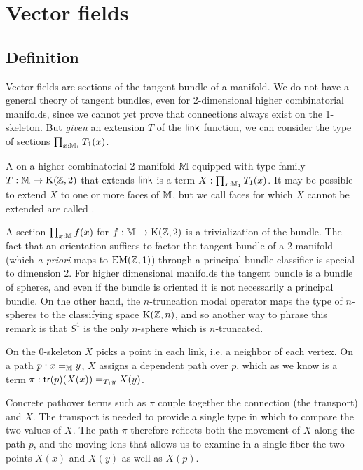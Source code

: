 \section{Vector fields}
\subsection{Definition}
Vector fields are sections of the tangent bundle of a manifold. We do not have a general theory of tangent bundles, even for 2-dimensional higher combinatorial manifolds, since we cannot yet prove that connections always exist on the 1-skeleton. But \emph{given} an extension \( T \) of the \( \operatorname{\mathsf{link}} \) function, we can consider the type of sections \( \prod_{x:\mathbb{M}_1}T_1(x) \).

\begin{mydef}
A  on a higher combinatorial 2-manifold \( \mathbb{M} \) equipped with type family \( T:\mathbb{M}\to\mathrm{K}(\mathbb{Z},2) \) that extends \( \operatorname{\mathsf{link}} \) is a term \( X:\prod_{x:\mathbb{M}_1}T_1(x) \). It may be possible to extend \( X \) to one or more faces of \( \mathbb{M} \), but we call faces for which \( X \) cannot be extended are called .
\end{mydef}

\begin{mynote}
A section \( \prod_{x:\mathbb{M}}f(x) \) for \( f:\mathbb{M}\to\mathrm{K}(\mathbb{Z},2) \) is a trivialization of the bundle. The fact that an orientation suffices to factor the tangent bundle of a 2-manifold (which \emph{a priori} maps to \( \mathrm{EM}(\mathbb{Z},1) \)) through a principal bundle classifier is special to dimension 2. For higher dimensional manifolds the tangent bundle is a bundle of spheres, and even if the bundle is oriented it is not necessarily a principal bundle. On the other hand, the \( n \)-truncation modal operator maps the type of \( n \)-spheres to the classifying space \( \mathrm{K}(\mathbb{Z},n) \), and so another way to phrase this remark is that \( S^1 \) is the only \( n \)-sphere which is \( n \)-truncated.
\end{mynote}

On the 0-skeleton \( X \) picks a point in each link, i.e. a neighbor of each vertex. On a path \( p:x=_{\mathbb{M}} y \), \( X \) assigns a dependent path over \( p \), which as we know is a term \( \pi:\mathsf{tr}(p)(X(x))=_{T_1 y} X(y) \).

\begin{mynote}Concrete pathover terms such as \( \pi \) couple together the connection (the transport) and \( X \). The transport is needed to provide a single type in which to compare the two values of \( X \). The path \( \pi \) therefore reflects both the movement of \( X \) along the path \( p \), and the moving lens that allows us to examine in a single fiber the two points \( X(x) \) and \( X(y) \) as well as \( X(p) \).\end{mynote}

